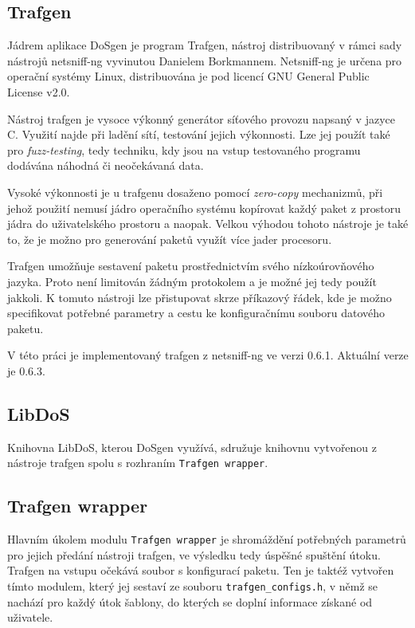 \subsection{Trafgen}
Jádrem aplikace DoSgen je program Trafgen, nástroj distribuovaný v rámci sady nástrojů netsniff-ng vyvinutou Danielem Borkmannem. Netsniff-ng je určena pro operační systémy Linux, distribuována je pod licencí GNU General Public License v2.0.

Nástroj trafgen je vysoce výkonný generátor síťového provozu napsaný v jazyce C. Využití najde při ladění sítí, testování jejich výkonnosti. Lze jej použít také pro \textit{fuzz-testing}, tedy techniku, kdy jsou na vstup testovaného programu dodávána náhodná či neočekávaná data.

Vysoké výkonnosti je u trafgenu dosaženo pomocí \textit{zero-copy} mechanizmů, při jehož použití nemusí jádro operačního systému kopírovat každý paket z prostoru jádra do uživatelského prostoru a naopak. Velkou výhodou tohoto nástroje je také to, že je možno pro generování paketů využít více jader procesoru.

Trafgen umožňuje sestavení paketu prostřednictvím svého nízkoúrovňového jazyka. Proto není limitován žádným protokolem a je možné jej tedy použít jakkoli. K tomuto nástroji lze přistupovat skrze příkazový řádek, kde je možno specifikovat potřebné parametry a cestu ke konfiguračnímu souboru datového paketu.

V této práci je implementovaný trafgen z netsniff-ng ve verzi 0.6.1. Aktuální verze je 0.6.3.

\subsection{LibDoS}
Knihovna LibDoS, kterou DoSgen využívá, sdružuje knihovnu vytvořenou z nástroje trafgen spolu s rozhraním \texttt{Trafgen wrapper}.

\subsection{Trafgen wrapper}
Hlavním úkolem modulu \texttt{Trafgen wrapper} je shromáždění potřebných parametrů pro jejich předání nástroji trafgen, ve výsledku tedy úspěšné spuštění útoku. Trafgen na vstupu očekává soubor s konfigurací paketu. Ten je taktéž vytvořen tímto modulem, který jej sestaví ze souboru \texttt{trafgen\_configs.h}, v němž se nachází pro každý útok šablony, do kterých se doplní informace získané od uživatele.

